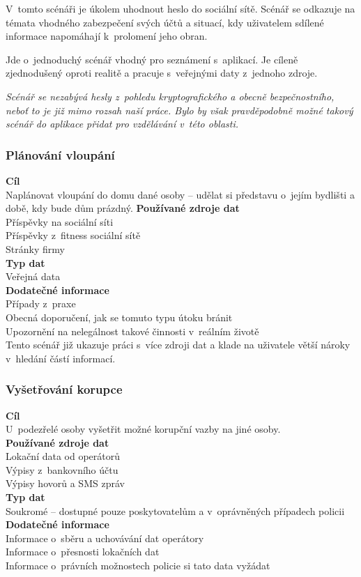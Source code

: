 V~tomto scénáři je úkolem uhodnout heslo do sociální sítě. Scénář se odkazuje na témata vhodného zabezpečení svých účtů a situací, kdy uživatelem sdílené informace napomáhají k~prolomení jeho obran.

Jde o~jednoduchý scénář vhodný pro seznámení s~aplikací. Je cíleně zjednodušený oproti realitě a pracuje s~veřejnými daty z~jednoho zdroje.

\textit{Scénář se nezabývá hesly z~pohledu kryptografického a obecně bezpečnostního, neboť to je již mimo rozsah naší práce. Bylo by však pravděpodobně možné takový scénář do aplikace přidat pro vzdělávání v~této oblasti.}


\subsubsection*{Plánování vloupání}
\textbf{Cíl}\\
Naplánovat vloupání do domu dané osoby -- udělat si představu o~jejím bydlišti a době, kdy bude dům prázdný.
\textbf{Používané zdroje dat}\\
Příspěvky na sociální síti\\
Příspěvky z~fitness sociální sítě\\
Stránky firmy\\
\textbf{Typ dat}\\
Veřejná data\\
\textbf{Dodatečné informace}\\
Případy z~praxe\\
Obecná doporučení, jak se tomuto typu útoku bránit\\ 
Upozornění na nelegálnost takové činnosti v~reálním životě\\

Tento scénář již ukazuje práci s~více zdroji dat a klade na uživatele větší nároky v~hledání částí informací.


\subsubsection*{Vyšetřování korupce}
\textbf{Cíl}\\
U~podezřelé osoby vyšetřit možné korupční vazby na jiné osoby.\\
\textbf{Používané zdroje dat}\\
Lokační data od operátorů\\
Výpisy z~bankovního účtu\\
Výpisy hovorů a SMS zpráv\\
\textbf{Typ dat}\\
Soukromé -- dostupné pouze poskytovatelům a v~oprávněných případech policii\\
\textbf{Dodatečné informace}\\
Informace o~sběru a uchovávání dat operátory\\
Informace o~přesnosti lokačních dat\\
Informace o~právních možnostech policie si tato data vyžádat\\


